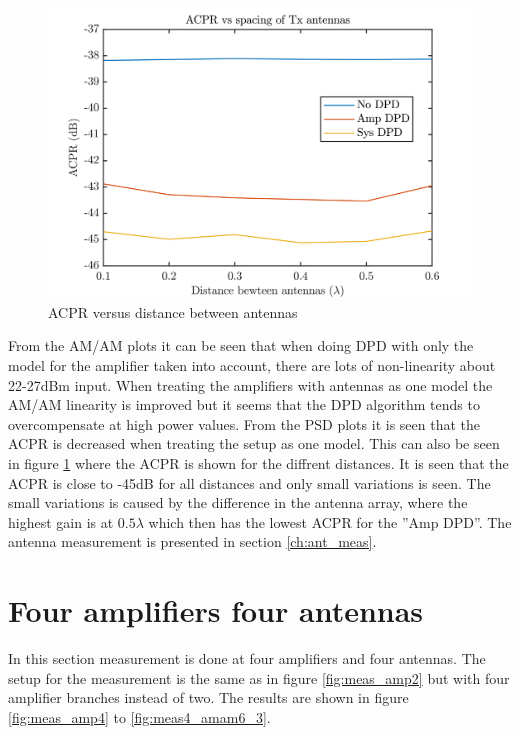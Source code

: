 \begin{figure}[H]
\centering 
\includegraphics[scale = 0.6]{figures/measurement/cree/meas3/acpr_two_ant.png}
\caption{ACPR versus distance between antennas}
\label{fig:meas2_dpd}
\end{figure}

From the AM/AM plots it can be seen that when doing DPD with only the model for the amplifier taken into account,  there are lots of non-linearity about 22-27dBm input. When treating the amplifiers with antennas as one model the AM/AM linearity is improved but it seems that the DPD algorithm tends to overcompensate at high power values. From the PSD plots it is seen that the ACPR is decreased when treating the setup as one model. This can also be seen in figure \ref{fig:meas2_dpd} where the ACPR is shown for the diffrent distances. It is seen that the ACPR is close to -45dB for all distances and only small variations is seen. The small variations is caused by the difference in the antenna array, where the highest gain is at $0.5\lambda$ which then has the lowest ACPR for the ''Amp DPD''. The antenna measurement is presented in section \ref{ch:ant_meas}.    





\section{Four amplifiers four antennas}

In this section measurement is done at four amplifiers and four antennas. The setup for the measurement is the same as in figure \ref{fig:meas_amp2} but with four amplifier branches instead of two. The results are shown in figure \ref{fig:meas_amp4} to \ref{fig:meas4_amam6_3}.

